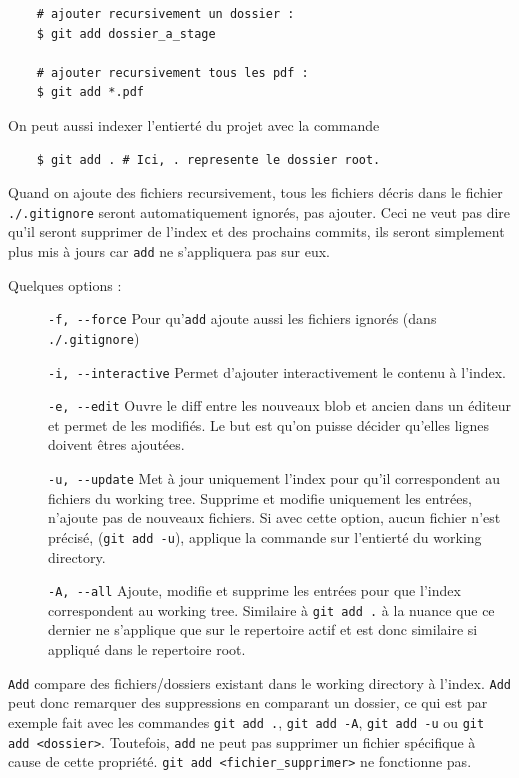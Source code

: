 \documentclass[a4paper, 12pt]{article}
\begin{document}
    \begin{lstlisting}
    # ajouter recursivement un dossier :
    $ git add dossier_a_stage

    # ajouter recursivement tous les pdf : 
    $ git add *.pdf
    \end{lstlisting} 

    \noindent On peut aussi indexer l'entierté du projet avec la commande
    \begin{lstlisting}
    $ git add . # Ici, . represente le dossier root.
    \end{lstlisting}

    Quand on ajoute des fichiers recursivement, tous les fichiers décris dans
    le fichier  \lstinline{./.gitignore} seront automatiquement ignorés, pas
    ajouter. Ceci ne veut pas dire qu'il seront supprimer de l'index et des
    prochains commits, ils seront simplement plus mis à jours car
    \lstinline{add} ne s'appliquera pas sur eux. 

    Quelques options :
    \begin{description}
        \item[] \lstinline{-f, --force} Pour qu'\lstinline{add} ajoute aussi les
        fichiers ignorés (dans \lstinline{./.gitignore})
        \item[] \lstinline{-i, --interactive} Permet d'ajouter interactivement
        le contenu à l'index. 
        \item[] \lstinline{-e, --edit} Ouvre le diff entre les nouveaux blob et
        ancien dans un éditeur et permet de les modifiés. Le but est qu'on
        puisse décider qu'elles lignes doivent êtres ajoutées.
        \item[] \lstinline{-u, --update} Met à jour uniquement l'index pour
        qu'il correspondent au fichiers du working tree. Supprime et modifie
        uniquement les entrées, n'ajoute pas de nouveaux fichiers.  Si avec
        cette option, aucun fichier n'est précisé, (\lstinline{git add -u}),
        applique la commande sur l'entierté du working directory.
        \item[] \lstinline{-A, --all} Ajoute, modifie et supprime les entrées 
        pour que l'index correspondent au working tree. Similaire à
        \lstinline{git add .} à la nuance que ce dernier ne s'applique que sur
        le repertoire actif et est donc similaire si appliqué dans le repertoire
        root.
    \end{description}

    \lstinline{Add} compare des fichiers/dossiers existant dans le working
    directory à l'index. \lstinline{Add} peut donc remarquer des suppressions en
    comparant un dossier, ce qui est par exemple fait avec les commandes
    \lstinline{git add .}, \lstinline{git add -A}, \lstinline{git add -u} ou
    \lstinline{git add <dossier>}. Toutefois, \lstinline{add} ne peut pas
    supprimer un fichier spécifique à cause de cette propriété.
    \lstinline{git add <fichier_supprimer>} ne fonctionne pas. 
    
\end{document}
